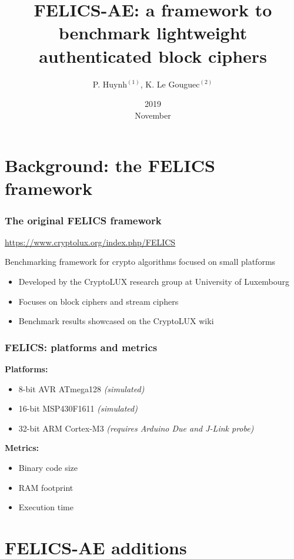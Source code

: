 \documentclass[english]{beamer}
\title{
  FELICS-AE: a framework to benchmark lightweight authenticated block ciphers
}
\date{2019\\ November}
\author{P. Huynh$^{(1)}$, K. Le Gouguec$^{(2)}$}
\institute{$^{(1)}$LORIA CNRS, $^{(2)}$Airbus CyberSecurity}
\begin{document}
\begin{frame}
  \titlepage
\end{frame}

\begin{frame}
  \tableofcontents
\end{frame}

\section[FELICS]{Background: the FELICS framework}

\begin{frame}
  \frametitle{The original FELICS framework}

  \url{https://www.cryptolux.org/index.php/FELICS}

  Benchmarking framework for crypto algorithms focused on small platforms

  \begin{itemize}
  \item Developed by the CryptoLUX research group at University of Luxembourg
  \item Focuses on block ciphers and stream ciphers
  \item Benchmark results showcased on the CryptoLUX wiki
  \end{itemize}

\end{frame}

\begin{frame}
  \frametitle{FELICS: platforms and metrics}

  \textbf{Platforms:}
  \begin{itemize}
  \item 8-bit AVR ATmega128 \emph{(simulated)}
  \item 16-bit MSP430F1611 \emph{(simulated)}
  \item 32-bit ARM Cortex-M3 \emph{(requires Arduino Due and J-Link probe)}
  \end{itemize}

  \pause

  \textbf{Metrics:}
  \begin{itemize}
  \item Binary code size
  \item RAM footprint
  \item Execution time
  \end{itemize}

\end{frame}

\section[FELICS-AE]{FELICS-AE additions}
\end{document}
